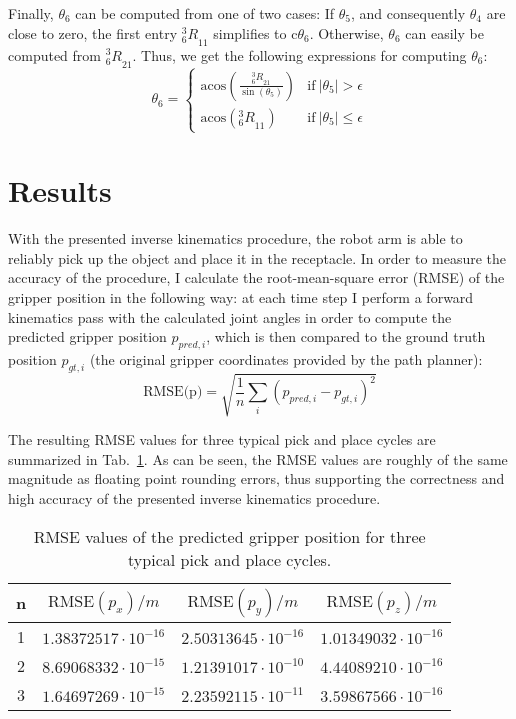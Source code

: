 \documentclass[twoside]{article}
\renewcommand{\c}{\text{c}}
\newcommand{\R}[2]{\mbox{$_{#2}^{#1}{R}$}}
\newcommand{\tabref}[1]{Tab.~\ref{tab:#1}}
\begin{document}
Finally, $\theta_6$ can be computed from one of two cases: If $\theta_5$, and
consequently $\theta_4$ are close to zero, the first entry $\R{3}{6}_{11}$ simplifies to
$\c\theta_6$. Otherwise, $\theta_6$ can easily be computed from $\R{3}{6}_{21}$.
Thus, we get the following expressions for computing $\theta_6$:
\begin{equation}
  \theta_6 =
  \begin{cases}
     \text{acos}\left(\frac{\R{3}{6}_{21}}{\sin(\theta_5)}\right) & \text{if}\ |\theta_5| > \epsilon \\
     \text{acos}\left(\R{3}{6}_{11}\right)                & \text{if}\ |\theta_5| \leq \epsilon
  \end{cases}
\end{equation}

\section{Results}
With the presented inverse kinematics procedure, the robot arm is able to reliably pick up
the object and place it in the receptacle. In order to measure the accuracy of the procedure,
I calculate the root-mean-square error (RMSE) of the gripper position in the following way:
at each time step I perform a forward kinematics pass with the calculated joint angles
in order to compute the predicted gripper position $p_{pred,i}$, which is then compared
to the ground truth position $p_{gt,i}$ (the original gripper coordinates provided by the path planner):
\begin{equation}
  \text{RMSE(p)} = \sqrt{\frac{1}{n}\sum\limits_i(p_{pred,i} - p_{gt,i})^2}
\end{equation}

The resulting RMSE values for three typical pick and place cycles are summarized in
\tabref{rmse}. As can be seen, the RMSE values are roughly of the same magnitude as floating point
rounding errors, thus supporting the correctness and high accuracy of the presented inverse kinematics procedure.

\begin{table}[ht]
  \caption{RMSE values of the predicted gripper position for three typical pick and place cycles.}
  \label{tab:rmse}
  \centering\begin{tabular}{c|ccc}
    n & $\text{RMSE}(p_x)/m$ & $\text{RMSE}(p_y)/m$ & $\text{RMSE}(p_z)/m$ \\
    \hline
    1 & $1.38372517 \cdot 10^{−16}$ & $2.50313645 \cdot 10^{−16}$ & $1.01349032 \cdot 10^{−16}$\\
    2 & $8.69068332 \cdot 10^{−15}$ & $1.21391017 \cdot 10^{−10}$ & $4.44089210 \cdot 10^{−16}$\\
    3 & $1.64697269 \cdot 10^{−15}$ & $2.23592115 \cdot 10^{−11}$ & $3.59867566 \cdot 10^{−16}$
  \end{tabular}
\end{table}
\end{document}
